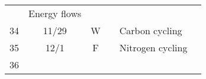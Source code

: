\documentclass[]{article}
\begin{document}
\begin{longtable}[]{@{}ccclll@{}}
\begin{minipage}[t]{0.10\columnwidth}
\strut
\end{minipage} & \begin{minipage}[t]{0.12\columnwidth}\raggedright\strut
Energy flows\strut
\end{minipage} & \begin{minipage}[t]{0.12\columnwidth}\raggedright\strut
\strut
\end{minipage}\tabularnewline
\begin{minipage}[t]{0.13\columnwidth}\centering\strut
34\strut
\end{minipage} & \begin{minipage}[t]{0.08\columnwidth}\centering\strut
11/29\strut
\end{minipage} & \begin{minipage}[t]{0.07\columnwidth}\centering\strut
W\strut
\end{minipage} & \begin{minipage}[t]{0.10\columnwidth}\raggedright\strut
\strut
\end{minipage} & \begin{minipage}[t]{0.12\columnwidth}\raggedright\strut
Carbon cycling\strut
\end{minipage} & \begin{minipage}[t]{0.12\columnwidth}\raggedright\strut
\strut
\end{minipage}\tabularnewline
\begin{minipage}[t]{0.13\columnwidth}\centering\strut
35\strut
\end{minipage} & \begin{minipage}[t]{0.08\columnwidth}\centering\strut
12/1\strut
\end{minipage} & \begin{minipage}[t]{0.07\columnwidth}\centering\strut
F\strut
\end{minipage} & \begin{minipage}[t]{0.10\columnwidth}\raggedright\strut
\strut
\end{minipage} & \begin{minipage}[t]{0.12\columnwidth}\raggedright\strut
Nitrogen cycling\strut
\end{minipage} & \begin{minipage}[t]{0.12\columnwidth}\raggedright\strut
\strut
\end{minipage}\tabularnewline
\begin{minipage}[t]{0.13\columnwidth}\centering\strut
36\strut
\end{minipage} & \begin{minipage}[t]{0.08\columnwidth}\centering\strut

\end{minipage}
\end{longtable}
\end{document}
